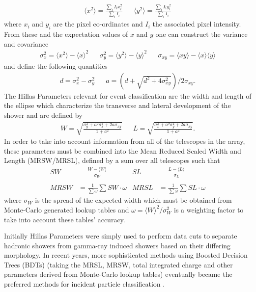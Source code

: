 \begin{align*}
\langle x^2 \rangle = \frac{\sum_i I_i x_i^2}{\sum_i I_i} && \langle y^2 \rangle = \frac{\sum_i I_i y_i^2}{\sum_i I_i}
\end{align*}
where $x_i$ and $y_i$ are the pixel co-ordinates and $I_i$ the associated pixel intensity. From these and the expectation values of $x$ and $y$ one can construct the variance and covariance
\begin{align*}
\sigma_x^2=\langle x^2 \rangle - \langle x \rangle^2&&\sigma_y^2=\langle y^2 \rangle - \langle y \rangle^2&&\sigma_{xy}=\langle xy \rangle - \langle x \rangle\langle y \rangle
\end{align*}
and define the following quantities
\begin{align*}
d=\sigma_x^2-\sigma_y^2&&a=(d+\sqrt{d^2+4\sigma_{xy}^2})/2\sigma_{xy}.
\end{align*}
The Hillas Parameters relevant for event classification are the width and length of the ellipse which characterize the transverse and lateral development of the shower and are defined by
\begin{align*}
W=\sqrt{\frac{\sigma_y^2+a^2\sigma_x^2+2a\sigma_{xy}}{1+a^2}}&&L=\sqrt{\frac{\sigma_x^2+a^2\sigma_y^2+2a\sigma_{xy}}{1+a^2}}.
\end{align*}
In order to take into account information from all of the telescopes in the array, these parameters must be combined into the Mean Reduced Scaled Width and Length (MRSW/MRSL), defined by a sum over all telescopes such that
\begin{align*}
SW&=\frac{W-\langle W \rangle}{\sigma_W}   &    SL&=\frac{L-\langle L \rangle}{\sigma_L}\\
\\ MRSW&=\frac{1}{\sum \omega}\sum SW\cdot \omega & MRSL&=\frac{1}{\sum \omega}\sum SL\cdot \omega
\end{align*}
where $\sigma_W$ is the spread of the expected width which must be obtained from Monte-Carlo generated lookup tables and $\omega=\langle W \rangle^2/\sigma_W^2$ is a weighting factor to take into account these tables' accuracy.

Initially Hillas Parameters were simply used to perform data cuts to separate hadronic showers from gamma-ray induced showers based on their differing morphology. In recent years, more sophisticated methods using Boosted Decision Trees (BDTs) (taking the MRSL, MRSW, total integrated charge and other parameters derived from Monte-Carlo lookup tables) eventually became the preferred methods for incident particle classification \cite{hessbdt}.

